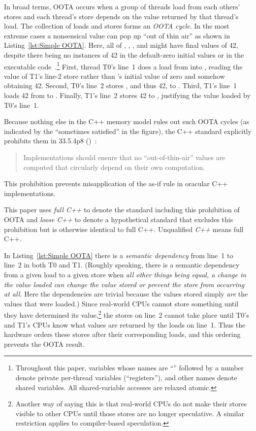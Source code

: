 In broad terms, OOTA occurs when a group of threads load from each others'
stores and each thread's store depends on the value returned by that
thread's load.
The collection of loads and stores forms an \emph{OOTA cycle}.
In the most extreme cases a nonsensical value can pop up ``out of thin air''
as shown in
Listing~\ref{lst:Simple OOTA}.
Here, all of , , , and  might have final
values of 42, despite there being no instances of 42 in the default-zero
initial values or in the executable
code~\cite{PaulEMcKenney2020RelaxedGuideRelaxed}.\footnote{
	Throughout this paper, variables whose names are ``''
	followed by a number denote private per-thread variables
	(``registers''),
	and other names denote shared variables.
	All shared-variable accesses are relaxed atomic.}
First, thread T0's line~1 does a load from  into ,
reading the value of T1's line-2 store rather than 's initial
value of zero and somehow obtaining 42.
Second, T0's line~2 stores , and thus 42, to .
Third, T1's line~1 loads 42 from  to .
Finally, T1's line~2 stores 42 to , justifying the value loaded
by T0's line~1.

Because nothing else in the C++ memory model rules out such OOTA cycles
(as indicated by the ``sometimes satisfied'' in the figure), the C++
standard explicitly prohibits them in 33.5.4p8
()~\cite{ThomasKoeppe2023N4950}:
\begin{quote}
	Implementations should ensure that no “out-of-thin-air” values
	are computed that circularly depend on their own computation.
\end{quote}
This prohibition prevents misapplication of the as-if rule in oracular
C++ implementations.

This paper uses \emph{full C++} to denote the standard including this
prohibition of OOTA and \emph{loose C++} to denote a hypothetical standard
that excludes this prohibition but is otherwise identical to full C++.
Unqualified \emph{C++} means full C++.

In Listing~\ref{lst:Simple OOTA}
there is a \emph{semantic dependency} from line~1 to line~2 in both
T0 and T1.
(Roughly speaking, there is a semantic dependency from a given load
to a given store when \emph{all other things being equal, a change in the
value loaded can change the value stored or prevent the store from
occurring at all.}
Here the dependencies are trivial because the values stored simply
\emph{are} the values that were loaded.)
Since real-world CPUs cannot store something
until they have determined its value,\footnote{
	Another way of saying this is that real-world CPUs do not
	make their stores visible to other CPUs until those stores
	are no longer speculative.
	A similar restriction applies to compiler-based speculation.}
the stores on line~2 cannot take place until T0's and T1's CPUs
know what values are returned by the loads on line~1.
Thus the hardware orders these stores after their corresponding loads,
and this ordering prevents the OOTA result.

